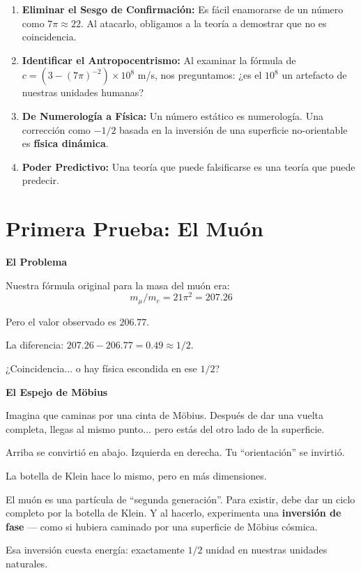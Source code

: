 \begin{enumerate}
    \item \textbf{Eliminar el Sesgo de Confirmación:}
    Es fácil enamorarse de un número como $7\pi \approx 22$.
    Al atacarlo, obligamos a la teoría a demostrar que no es coincidencia.

    \item \textbf{Identificar el Antropocentrismo:}
    Al examinar la fórmula de $c = (3 - (7\pi)^{-2}) \times 10^8$ m/s,
    nos preguntamos: ¿es el $10^8$ un artefacto de nuestras unidades humanas?

    \item \textbf{De Numerología a Física:}
    Un número estático es numerología.
    Una corrección como $-1/2$ basada en la inversión de una superficie no-orientable
    es \textbf{física dinámica}.

    \item \textbf{Poder Predictivo:}
    Una teoría que puede falsificarse es una teoría que puede predecir.
\end{enumerate}


\section{Primera Prueba: El Muón}

\begin{nivelconceptual}
\textbf{El Problema}

Nuestra fórmula original para la masa del muón era:
\[m_\mu/m_e = 21\pi^2 = 207.26\]

Pero el valor observado es $206.77$.

La diferencia: $207.26 - 206.77 = 0.49 \approx 1/2$.

¿Coincidencia... o hay física escondida en ese $1/2$?
\end{nivelconceptual}

\begin{analogiabox}
\textbf{El Espejo de Möbius}

Imagina que caminas por una cinta de Möbius.
Después de dar una vuelta completa, llegas al mismo punto...
pero estás del otro lado de la superficie.

Arriba se convirtió en abajo. Izquierda en derecha.
Tu ``orientación'' se invirtió.

La botella de Klein hace lo mismo, pero en más dimensiones.

El muón es una partícula de ``segunda generación''.
Para existir, debe dar un ciclo completo por la botella de Klein.
Y al hacerlo, experimenta una \textbf{inversión de fase} ---
como si hubiera caminado por una superficie de Möbius cósmica.

Esa inversión cuesta energía: exactamente $1/2$ unidad en nuestras unidades naturales.
\end{analogiabox}

